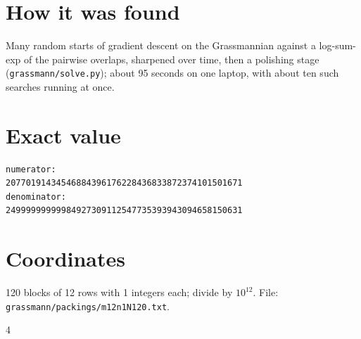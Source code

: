 \documentclass[11pt,a4paper]{article}
\begin{document}
\section{How it was found}
Many random starts of gradient descent on the Grassmannian against a log-sum-exp of the pairwise overlaps, sharpened over time, then a polishing stage (\texttt{grassmann/solve.py}); about 95 seconds on one laptop, with about ten such searches running at once.


\appendix
\section{Exact value}
{\small
\begin{verbatim}
numerator:
20770191434546884396176228436833872374101501671
denominator:
24999999999984927309112547735393943094658150631
\end{verbatim}}

\section{Coordinates}
120 blocks of 12 rows with 1 integers each; divide by $10^{12}$. File: \texttt{grassmann/packings/m12n1N120.txt}.
{\tiny
\begin{multicols}{4}
\end{multicols}}
\end{document}
